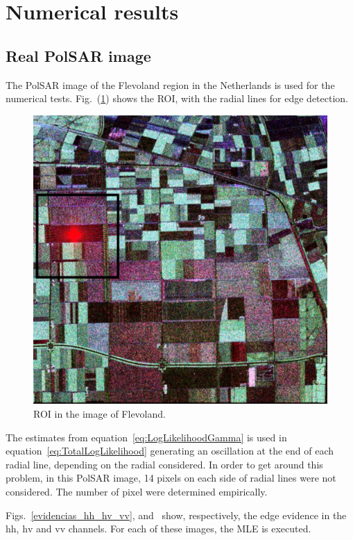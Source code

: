 \documentclass[journal]{IEEEtran}
\begin{document}
\section{Numerical results}\label{sec_05}

\subsection{Real PolSAR image}
The PolSAR image of the Flevoland region in the Netherlands is used for the numerical tests. 
Fig.~(\ref{flevoland_radial_4look}) shows the ROI, with the radial lines for edge detection.

\begin{figure}[hbt]
\centering
	\includegraphics[width=\linewidth]{flevoland_radial_4_look_black}
	\caption{ROI in the image of Flevoland.}
\label{flevoland_radial_4look}
\end{figure}

The estimates from equation~\eqref{eq:LogLikelihoodGamma} is used in equation~\eqref{eq:TotalLogLikelihood} generating an oscillation at the end of each radial line, depending on the radial considered. In order to get around this problem, in this PolSAR image, 14 pixels on each side of radial lines were not considered. The number of pixel were determined empirically.

Figs.~\ref{evidencias_hh_hv_vv},  and~ show, respectively, the edge evidence in the $\text{hh}$, $\text{hv}$ and $\text{vv}$ channels. For each of these images, the MLE is executed.
\end{document}
